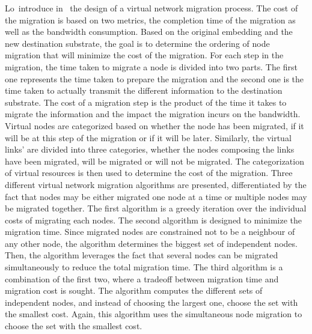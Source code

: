 Lo~\etal introduce in~\cite{vnm-lo2013} the design of a virtual network migration process.
The cost of the migration is based on two metrics, the completion time of the migration as well as the bandwidth consumption.
Based on the original embedding and the new destination substrate, the goal is to determine the ordering of node migration that will minimize the cost of the migration.
For each step in the migration, the time taken to migrate a node is divided into two parts. The first one represents the time taken to prepare the migration and the second one is the time taken to actually transmit the different information to the destination substrate.
The cost of a migration step is the product of the time it takes to migrate the information and the impact the migration incurs on the bandwidth.
Virtual nodes are categorized based on whether the node has been migrated, if it will be at this step of the migration or if it will be later.
Similarly, the virtual links' are divided into three categories, whether the nodes composing the links have been migrated, will be migrated or will not be migrated.
The categorization of virtual resources is then used to determine the cost of the migration.
Three different virtual network migration algorithms are presented, differentiated by the fact that nodes may be either migrated one node at a time or multiple nodes may be migrated together.
The first algorithm is a greedy iteration over the individual costs of migrating each nodes.
The second algorithm is designed to minimize the migration time. Since migrated nodes are constrained not to be a neighbour of any other node, the algorithm determines the biggest set of independent nodes.
Then, the algorithm leverages the fact that several nodes can be migrated simultaneously to reduce the total migration time.
The third algorithm is a combination of the first two, where a tradeoff between migration time and migration cost is sought. The algorithm computes the different sets of independent nodes, and instead of choosing the largest one, choose the set with the smallest cost.
Again, this algorithm uses the simultaneous node migration to choose the set with the smallest cost.

